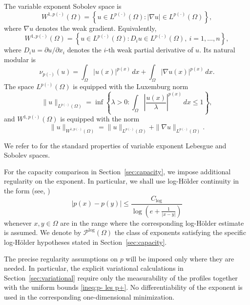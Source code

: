 \documentclass[12pt]{amsart}
\numberwithin{equation}{section}
\theoremstyle{plain}
\theoremstyle{definition}
\begin{document}
The variable exponent Sobolev space is \cite[Chapter 8]{Diening2011}
\begin{equation*}
W^{1,p(\cdot)}(\Omega)
=
\left\{
u\in L^{p(\cdot)}(\Omega):
|\nabla u|\in L^{p(\cdot)}(\Omega)
\right\},
\end{equation*}
where $\nabla u$ denotes the weak gradient. Equivalently,
\begin{equation*}
W^{1,p(\cdot)}(\Omega)
=
\left\{
u\in L^{p(\cdot)}(\Omega):
D_i u\in L^{p(\cdot)}(\Omega),
\ i=1,\ldots,n
\right\},
\end{equation*}
where $D_i u=\partial u/\partial x_i$ denotes the $i$-th weak partial derivative of $u$.
Its natural modular is
\begin{equation*}
\nu_{p(\cdot)}(u)
=
\int_\Omega |u(x)|^{p(x)}\,dx
+
\int_\Omega |\nabla u(x)|^{p(x)}\,dx.
\end{equation*}
The space $L^{p(\cdot)}(\Omega)$ is equipped with the Luxemburg norm
\begin{equation*}
\|u\|_{L^{p(\cdot)}(\Omega)}
=
\inf\left\{
\lambda>0:
\int_\Omega
\left|\frac{u(x)}{\lambda}\right|^{p(x)}\,dx
\le1
\right\},
\end{equation*}
and $W^{1,p(\cdot)}(\Omega)$ is equipped with the norm
\begin{equation*}
\|u\|_{W^{1,p(\cdot)}(\Omega)}
=
\|u\|_{L^{p(\cdot)}(\Omega)}
+
\|\nabla u\|_{L^{p(\cdot)}(\Omega)}.
\end{equation*}

We refer to
\cite{Cruz2013,Diening2011,FZ, FSZ, KR}
for the standard properties of variable exponent Lebesgue and Sobolev
spaces.




For the capacity comparison in Section~\ref{sec:capacity}, we impose
additional regularity on the exponent. In particular, we shall use
log-H\"older continuity in the form (see, \cite[Definition 4.1.1]{Diening2011})
\begin{equation*}
|p(x)-p(y)|
\le
\frac{C_{\log}}
{\log\left(e+\frac{1}{|x-y|}\right)}
\end{equation*}
whenever $x,y\in\Omega$ are in the range where the corresponding
log-H\"older estimate is assumed. We denote by
$\mathcal P^{\log}(\Omega)$ the class of exponents satisfying the
specific log-H\"older hypotheses stated in Section~\ref{sec:capacity}.

The precise regularity assumptions on $p$ will be imposed only where
they are needed. In particular, the explicit variational calculations
in Section~\ref{sec:variational} require only the measurability of the
profiles together with the uniform bounds \eqref{ineq:p- les p+}.
No differentiability of the exponent is used in the corresponding
one-dimensional minimization.
\end{document}
